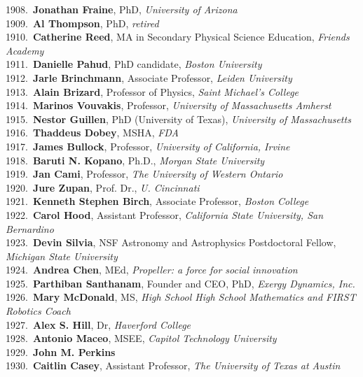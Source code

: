 1908.~{\bf Jonathan Fraine}, PhD, {\sl University of Arizona} \\
1909.~{\bf Al Thompson}, PhD, {\sl retired} \\
1910.~{\bf Catherine Reed}, MA in Secondary Physical Science Education, {\sl Friends Academy} \\
1911.~{\bf Danielle Pahud}, PhD candidate, {\sl Boston University} \\
1912.~{\bf Jarle Brinchmann}, Associate Professor, {\sl Leiden University} \\
1913.~{\bf Alain Brizard}, Professor of Physics, {\sl Saint Michael's College} \\
1914.~{\bf Marinos Vouvakis}, Professor, {\sl University of Massachusetts Amherst} \\
1915.~{\bf Nestor Guillen}, PhD (University of Texas), {\sl University of Massachusetts} \\
1916.~{\bf Thaddeus Dobey}, MSHA, {\sl FDA} \\
1917.~{\bf James Bullock}, Professor, {\sl University of California, Irvine} \\
1918.~{\bf Baruti N. Kopano}, Ph.D., {\sl Morgan State University} \\
1919.~{\bf Jan Cami}, Professor, {\sl The University of Western Ontario} \\
1920.~{\bf Jure Zupan}, Prof. Dr., {\sl U. Cincinnati} \\
1921.~{\bf Kenneth Stephen Birch}, Associate Professor, {\sl Boston College} \\
1922.~{\bf Carol Hood}, Assistant Professor, {\sl California State University, San Bernardino} \\
1923.~{\bf Devin Silvia}, NSF Astronomy and Astrophysics Postdoctoral Fellow, {\sl Michigan State University} \\
1924.~{\bf Andrea Chen}, MEd, {\sl Propeller: a force for social innovation } \\
1925.~{\bf Parthiban Santhanam}, Founder and CEO, PhD, {\sl Exergy Dynamics, Inc.} \\
1926.~{\bf Mary McDonald}, MS, {\sl High School High School Mathematics and FIRST Robotics Coach} \\
1927.~{\bf Alex S. Hill}, Dr, {\sl Haverford College} \\
1928.~{\bf Antonio Maceo}, MSEE, {\sl Capitol Technology University} \\
1929.~{\bf John M. Perkins} \\
1930.~{\bf Caitlin Casey}, Assistant Professor, {\sl The University of Texas at Austin} \\
